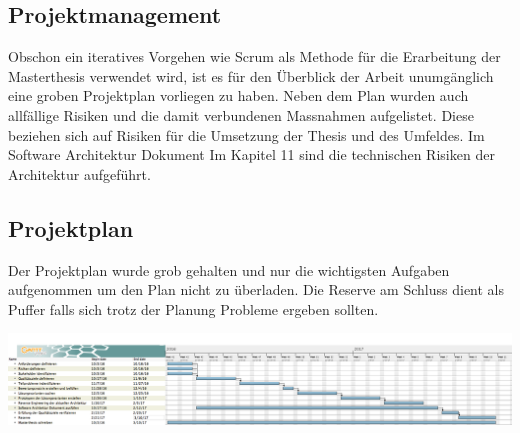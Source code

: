 \graphicspath{{./images/}}


\begin{landscape}
	
\chapter{Projektmanagement}

Obschon ein iteratives Vorgehen wie Scrum als Methode für die Erarbeitung der Masterthesis verwendet wird, ist es für den Überblick der Arbeit unumgänglich eine groben Projektplan vorliegen zu haben. Neben dem Plan wurden auch allfällige Risiken und die damit verbundenen Massnahmen aufgelistet. Diese beziehen sich auf Risiken für die Umsetzung der Thesis und des Umfeldes. Im Software Architektur Dokument Im Kapitel 11 sind die technischen Risiken der Architektur aufgeführt.


\section{Projektplan}

Der Projektplan wurde grob gehalten und nur die wichtigsten Aufgaben aufgenommen um den Plan nicht zu überladen. Die Reserve am Schluss dient als Puffer falls sich trotz der Planung Probleme ergeben sollten.

\begin{center}
	\includegraphics[scale=0.37]{projectplan.png}
\end{center}
\newpage	


\end{landscape}
